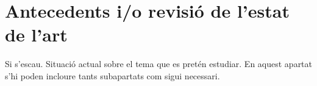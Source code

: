 \chapter{Antecedents i/o revisió de l’estat de l’art }

Si s'escau. Situació actual sobre el tema que es pretén estudiar. En aquest apartat s’hi poden incloure tants subapartats com sigui necessari.